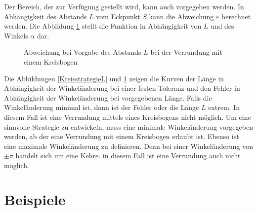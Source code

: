 \bigskip

Der Bereich, der zur Verfügung gestellt wird, kann auch vorgegeben werden. In Abhängigkeit des Abstands $L$ vom Eckpunkt $S$ kann die Abweichung $\varepsilon$ berechnet werden. Die Abbildung \ref{KreisstrategieEps} stellt die Funktion in Abhängigkeit von $L$ und des Winkels $\alpha$ dar.



 
\begin{figure}
  \begin{center}
  \end{center}
  \caption{Abweichung bei Vorgabe des Abstands $L$ bei der Verrundung mit einem Kreisbogen}\label{KreisstrategieEps}
\end{figure}


Die Abbildungen \ref{KreisstrategieL} und \ref{KreisstrategieEps} zeigen die Kurven der Länge in Abhängigkeit der Winkeländerung bei einer festen Toleranz und den Fehler in Abhängigkeit der Winkeländerung bei vorgegebenen Länge. Falls die Winkeländerung minimal ist, dann  ist der Fehler oder die Länge $L$ extrem. In diesem Fall ist eine Verrundung mittels eines Kreisbogens nicht möglich. Um eine sinnvolle Strategie zu entwickeln, muss eine minimale Winkeländerung vorgegeben werden, ab der eine Verrundung mit einem Kreisbogen erlaubt ist. Ebenso ist eine maximale
Winkeländerung zu definieren. Denn bei einer Winkeländerung von $\pm \pi$ handelt sich um eine Kehre. in diesem Fall ist eine Verrundung auch nicht 
möglich.




\section{Beispiele}

